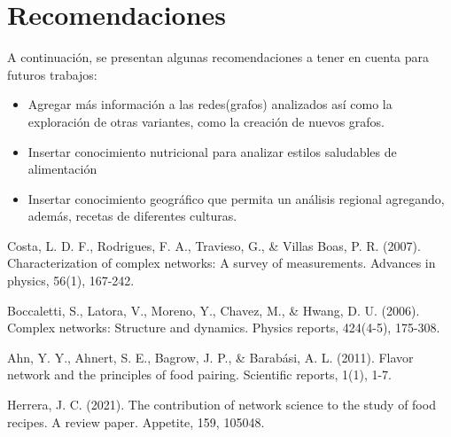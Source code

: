 \documentclass[a4paper]{article}
\begin{document}
\section{Recomendaciones}\label{sec:rec}

A continuación, se presentan algunas recomendaciones a tener en cuenta para
futuros trabajos:
\begin{itemize}
	\item Agregar más información a las redes(grafos) analizados así como la
	exploración de otras variantes, como la creación de nuevos grafos.
	\item Insertar conocimiento nutricional para analizar estilos saludables de
	alimentación
	\item Insertar conocimiento geográfico que permita un análisis regional
	agregando, además, recetas de diferentes culturas.
\end{itemize}




\begin{thebibliography}{99}
	 Costa, L. D. F., Rodrigues, F. A., Travieso, G., \& Villas Boas, P. R. (2007). Characterization of complex networks: A survey of measurements. Advances in physics, 56(1), 167-242.

	 Boccaletti, S., Latora, V., Moreno, Y., Chavez, M., \& Hwang, D. U. (2006). Complex networks: Structure and dynamics. Physics reports, 424(4-5), 175-308.

	 Ahn, Y. Y., Ahnert, S. E., Bagrow, J. P., & Barabási, A. L. (2011). Flavor network and the principles of food pairing. Scientific reports, 1(1), 1-7.

	 Herrera, J. C. (2021). The contribution of network science to the study of food recipes. A review paper. Appetite, 159, 105048.

\end{thebibliography}


\label{end}
\end{document}
